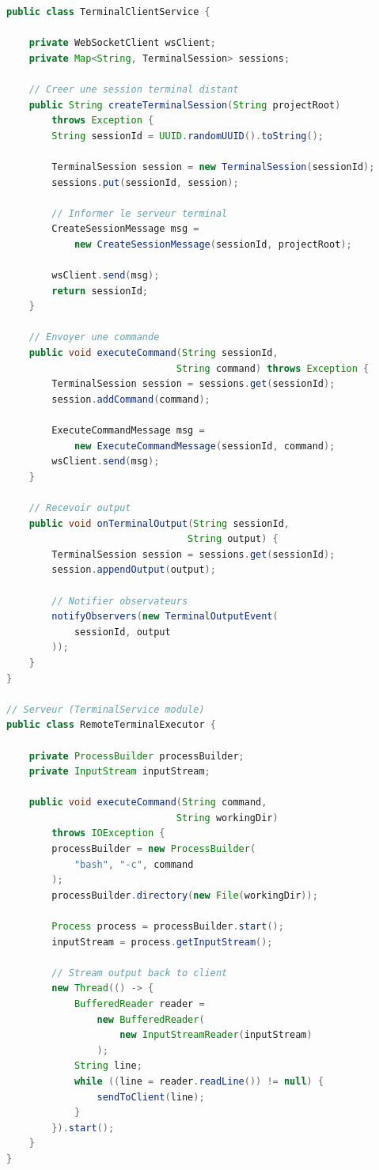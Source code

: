 \documentclass[11pt,a4paper,hidelinks]{book}
\begin{document}
\begin{lstlisting}[language=Java, caption={Architecture Terminal Distant}]
public class TerminalClientService {
    
    private WebSocketClient wsClient;
    private Map<String, TerminalSession> sessions;
    
    // Creer une session terminal distant
    public String createTerminalSession(String projectRoot) 
        throws Exception {
        String sessionId = UUID.randomUUID().toString();
        
        TerminalSession session = new TerminalSession(sessionId);
        sessions.put(sessionId, session);
        
        // Informer le serveur terminal
        CreateSessionMessage msg = 
            new CreateSessionMessage(sessionId, projectRoot);
        
        wsClient.send(msg);
        return sessionId;
    }
    
    // Envoyer une commande
    public void executeCommand(String sessionId, 
                              String command) throws Exception {
        TerminalSession session = sessions.get(sessionId);
        session.addCommand(command);
        
        ExecuteCommandMessage msg = 
            new ExecuteCommandMessage(sessionId, command);
        wsClient.send(msg);
    }
    
    // Recevoir output
    public void onTerminalOutput(String sessionId, 
                                String output) {
        TerminalSession session = sessions.get(sessionId);
        session.appendOutput(output);
        
        // Notifier observateurs
        notifyObservers(new TerminalOutputEvent(
            sessionId, output
        ));
    }
}

// Serveur (TerminalService module)
public class RemoteTerminalExecutor {
    
    private ProcessBuilder processBuilder;
    private InputStream inputStream;
    
    public void executeCommand(String command, 
                              String workingDir) 
        throws IOException {
        processBuilder = new ProcessBuilder(
            "bash", "-c", command
        );
        processBuilder.directory(new File(workingDir));
        
        Process process = processBuilder.start();
        inputStream = process.getInputStream();
        
        // Stream output back to client
        new Thread(() -> {
            BufferedReader reader = 
                new BufferedReader(
                    new InputStreamReader(inputStream)
                );
            String line;
            while ((line = reader.readLine()) != null) {
                sendToClient(line);
            }
        }).start();
    }
}
\end{lstlisting}
\end{document}
